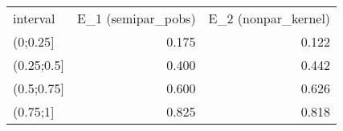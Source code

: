 \begin{table}[ht]
\centering
\begin{tabular}{lrr}
 interval & E\_1 (semipar\_pobs) & E\_2 (nonpar\_kernel) \\ 
 (0;0.25] & 0.175 & 0.122 \\ 
  (0.25;0.5] & 0.400 & 0.442 \\ 
  (0.5;0.75] & 0.600 & 0.626 \\ 
  (0.75;1] & 0.825 & 0.818 \\ 
  \end{tabular}
\end{table}
